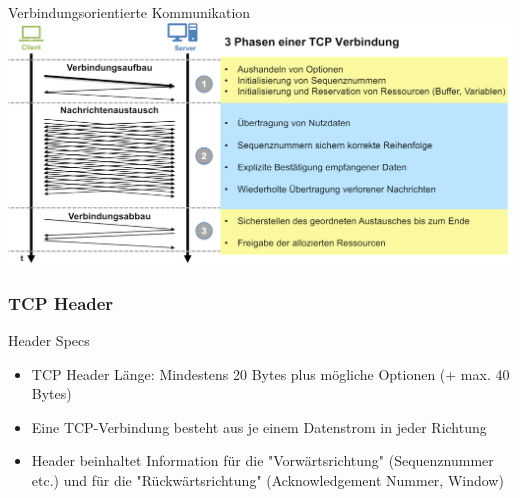 \begin{concept}{Verbindungsorientierte Kommunikation}\\
    \includegraphics[width=1\linewidth]{images/verbindungsorientierte_kommunikation.png}
\end{concept}

\subsubsection{TCP Header}

\begin{definition}{Header Specs}
    \begin{itemize}
        \item TCP Header Länge: Mindestens 20 Bytes plus mögliche Optionen (+ max. 40 Bytes)
        \item Eine TCP-Verbindung besteht aus je einem Datenstrom in jeder Richtung
        \item Header beinhaltet Information für die "Vorwärtsrichtung" (Sequenznummer etc.) und für die "Rückwärtsrichtung" (Acknowledgement Nummer, Window)
    \end{itemize}
\end{definition}

